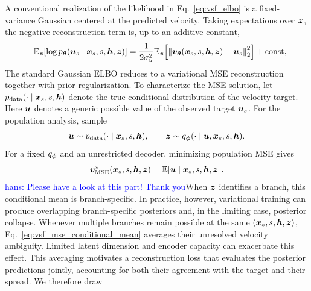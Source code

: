 \documentclass{article} %
\numberwithin{equation}{section}
\newcommand{\hans}[1]{\textcolor{blue}{hans: #1}}
\begin{document}
A conventional realization of the likelihood in Eq.~\ref{eq:vsf_elbo} is a
fixed-variance Gaussian centered at the predicted velocity.
Taking expectations over
${\bm{z}}$, the negative reconstruction
term is, up to an additive constant,
\begin{equation}
    -\mathbb{E}_{{\bm{z}}}
    \!\left[
        \log p_{{\bm{\theta}}}({\bm{u}}_s\mid{\bm{x}}_s,s,{\bm{h}},{\bm{z}})
    \right]
    =
    \frac{1}{2\sigma_u^2}
    \mathbb{E}_{{\bm{z}}}
    \!\left[
        \left\|
            {\bm{v}}_{{\bm{\theta}}}({\bm{x}}_s,s,{\bm{h}},{\bm{z}})-{\bm{u}}_s
        \right\|_2^2
    \right]
    +\mathrm{const},
    \label{eq:vsf_variational_mse}
\end{equation}
The standard Gaussian ELBO reduces to a variational MSE
reconstruction together with prior regularization.
To characterize the MSE solution, let
$p_{\mathrm{data}}(\cdot\mid{\bm{x}}_s,s,{\bm{h}})$ denote the true conditional
distribution of the velocity target. Here ${\bm{u}}$ denotes a generic possible
value of the observed target ${\bm{u}}_s$. For the population analysis, sample
\begin{equation*}
    {\bm{u}}\sim p_{\mathrm{data}}(\cdot\mid{\bm{x}}_s,s,{\bm{h}}),
    \qquad
    {\bm{z}}\sim q_{\boldsymbol{\phi}}(\cdot\mid{\bm{u}},{\bm{x}}_s,s,{\bm{h}}).
\end{equation*}
For a fixed $q_{\boldsymbol{\phi}}$ and an unrestricted decoder, minimizing population
MSE gives
\begin{equation}
    {\bm{v}}_{\mathrm{MSE}}^\star({\bm{x}}_s,s,{\bm{h}},{\bm{z}})
    =
    \mathbb{E}\!\left[
        {\bm{u}}\mid{\bm{x}}_s,s,{\bm{h}},{\bm{z}}
    \right].
    \label{eq:vsf_mse_conditional_mean}
\end{equation}
\hans{Please have a look at this part! Thank you}When ${\bm{z}}$ identifies a branch, this conditional mean is branch-specific.
In practice, however, variational training can produce overlapping
branch-specific posteriors and, in the limiting case, posterior
collapse. Whenever multiple branches remain possible at the same
$({\bm{x}}_s,s,{\bm{h}},{\bm{z}})$, Eq.~\ref{eq:vsf_mse_conditional_mean} averages their
unresolved velocity ambiguity. Limited latent dimension and encoder capacity
can exacerbate this effect. This averaging motivates a reconstruction loss
that evaluates the posterior predictions jointly, accounting for both their
agreement with the target and their spread. We therefore draw
\end{document}
